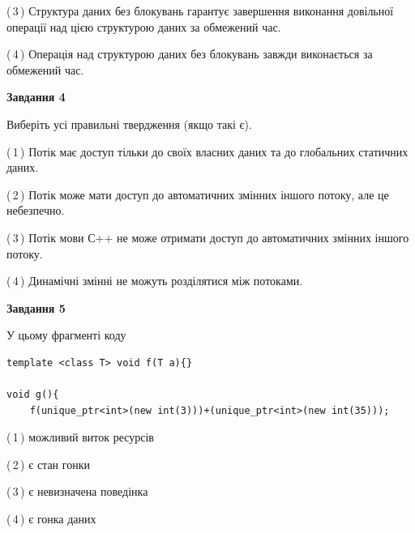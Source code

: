 \documentclass[12pt, ukrainian]{article}
\begin{document}
\begin {large}
{(\,3\,) Структура даних без блокувань гарантує завершення виконання довільної операції над цією структурою даних за обмежений час.%

(\,4\,) Операція над структурою даних без блокувань завжди виконається за обмежений час.%



\begin{center}
\textbf{Завдання 4}
\end{center}
Виберіть усі правильні твердження (якщо такі є).\par
\vspace{2mm}

(\,1\,) Потік має доступ тільки до своїх власних даних та до глобальних статичних даних.%

(\,2\,) Потік може мати доступ до автоматичних змінних іншого потоку, але це небезпечно.%

(\,3\,) Потік мови С++ не може отримати доступ до автоматичних змінних іншого потоку.%

(\,4\,) Динамічні змінні не можуть розділятися між потоками.%



\begin{center}
\textbf{Завдання 5}
\end{center}
У цьому фрагменті коду
\begin{verbatim}
template <class T> void f(T a){}

void g(){
    f(unique_ptr<int>(new int(3)))+(unique_ptr<int>(new int(35)));
\end{verbatim}

(\,1\,) можливий виток ресурсів%

(\,2\,) є стан гонки%

(\,3\,) є невизначена поведінка%

(\,4\,) є гонка даних%


}
\end {large}
\end{document}
